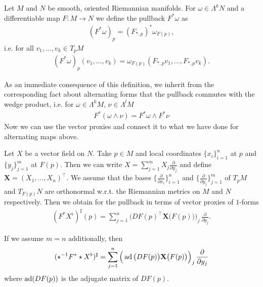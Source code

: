 \documentclass[../master_thesis.tex]{subfiles}
\begin{document}
\begin{definition}
    Let $M$ and $N$ be smooth, oriented Riemannian manifolds.
    For $\omega \in \Lambda^k N$ and a differentiable map $F:M \rightarrow N$ 
    we define the pullback $F^*\omega$ as
    \begin{align*}
        (F^*\omega)_p = (F_{*,p})^* \omega_{F(p)},
    \end{align*}
    i.e. for all $v_1,...,v_k \in T_p M$
    \begin{align*}
        (F^*\omega)_p (v_1,...,v_k) = \omega_{F(p)}(F_{*,p} v_1, ..., F_{*,p} v_k).
    \end{align*}
\end{definition}
As an immediate consequence of this definition, we inherit from the corresponding fact about alternating forms
that 
the pullback commutes with the wedge product, i.e. for $\omega \in \Lambda^k M$, 
$\nu \in \Lambda^{l} M$
\begin{align*}
    F^*(\omega \wedge \nu ) = F^* \omega \wedge F^* \nu
\end{align*}
Now we can use the vector proxies and connect it to what we have done 
for alternating maps above. 
\begin{proposition}\label{prop:pullback_vector_fields}
    Let $X$ be a vector field on $N$. Take $p \in M$ and local coordinates
    $\{x_i\}_{i=1}^n$ at $p$ and $\{y_j\}_{j=1}^m$ at $F(p)$. 
    Then we can write $X = \sum_{j=1}^m X_j \frac{\partial}{\partial y_j}$
    and define $\mathbf{X} = (X_1,..., X_n)^\top$.
    We assume that the bases
    $\{ \frac{\partial}{\partial x_i} \}_{i=1}^n$ and 
    $\{ \frac{\partial}{\partial y_j} \}_{j=1}^m$ of $T_p M$ and $T_{F(p)} N$ 
    are orthonormal w.r.t. the Riemannian metrics
    on $M$ and $N$ respectively. 
    Then we obtain for the pullback in terms of
    vector proxies of $1$-forms
    \begin{align*}
        (F^* X^\flat)^\sharp(p)
        = \sum_{j=1}^n \Big(DF(p)^\top \mathbf{X}\big(F(p)\big)\Big)_j\, \frac{\partial}{\partial y_j}.
    \end{align*}

    If we assume $m=n$ additionally, then 
    \begin{align*}
        (\star^{-1} F^* \star X^\flat)^\sharp 
        = \sum_{j=1}^n \Big(\operatorname{ad}\big( DF(p) \big) \mathbf{X}\big(F(p)\big)\Big)_j\, \frac{\partial}{\partial y_j}
    \end{align*}
    where $\operatorname{ad}(DF(p))$ is the adjugate matrix of $DF(p)$.
\end{proposition}
\end{document}
